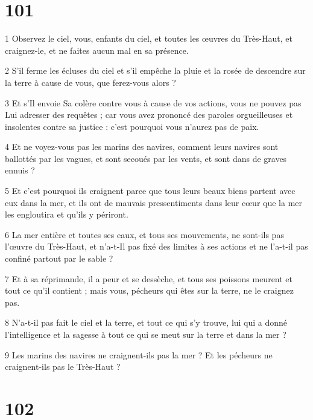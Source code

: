 \chapter{101}

\par 1 Observez le ciel, vous, enfants du ciel, et toutes les œuvres du Très-Haut, et craignez-le, et ne faites aucun mal en sa présence.
\par 2 S'il ferme les écluses du ciel et s'il empêche la pluie et la rosée de descendre sur la terre à cause de vous, que ferez-vous alors ?
\par 3 Et s'Il envoie Sa colère contre vous à cause de vos actions, vous ne pouvez pas Lui adresser des requêtes ; car vous avez prononcé des paroles orgueilleuses et insolentes contre sa justice : c'est pourquoi vous n'aurez pas de paix.
\par 4 Et ne voyez-vous pas les marins des navires, comment leurs navires sont ballottés par les vagues, et sont secoués par les vents, et sont dans de graves ennuis ?
\par 5 Et c'est pourquoi ils craignent parce que tous leurs beaux biens partent avec eux dans la mer, et ils ont de mauvais pressentiments dans leur cœur que la mer les engloutira et qu'ils y périront.
\par 6 La mer entière et toutes ses eaux, et tous ses mouvements, ne sont-ils pas l'œuvre du Très-Haut, et n'a-t-Il pas fixé des limites à ses actions et ne l'a-t-il pas confiné partout par le sable ?
\par 7 Et à sa réprimande, il a peur et se dessèche, et tous ses poissons meurent et tout ce qu'il contient ; mais vous, pécheurs qui êtes sur la terre, ne le craignez pas.
\par 8 N'a-t-il pas fait le ciel et la terre, et tout ce qui s'y trouve, lui qui a donné l'intelligence et la sagesse à tout ce qui se meut sur la terre et dans la mer ?
\par 9 Les marins des navires ne craignent-ils pas la mer ? Et les pécheurs ne craignent-ils pas le Très-Haut ?

\chapter{102}

